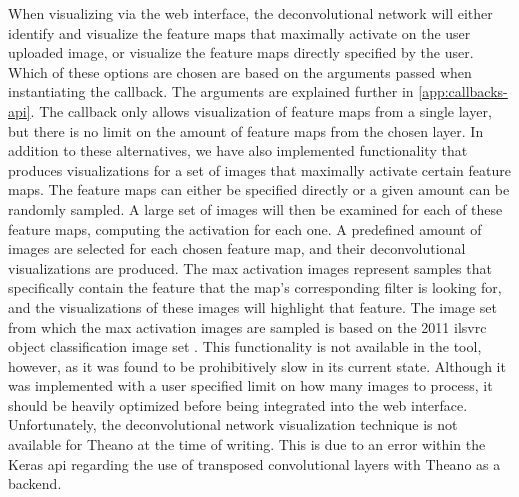\noindent When visualizing via the web interface, the deconvolutional network will either identify and visualize the feature maps that maximally activate on the user uploaded image, or visualize the feature maps directly specified by the user. Which of these options are chosen are based on the arguments passed when instantiating the callback. The arguments are explained further in \autoref{app:callbacks-api}. The callback only allows visualization of feature maps from a single layer, but there is no limit on the amount of feature maps from the chosen layer. In addition to these alternatives, we have also implemented functionality that produces visualizations for a set of images that maximally activate certain feature maps. The feature maps can either be specified directly or a given amount can be randomly sampled. A large set of images will then be examined for each of these feature maps, computing the activation for each one. A predefined amount of images are selected for each chosen feature map, and their deconvolutional visualizations are produced. The max activation images represent samples that specifically contain the feature that the map's corresponding filter is looking for, and the visualizations of these images will highlight that feature. The image set from which the max activation images are sampled is based on the 2011 \acrshort{ilsvrc} object classification image set \cite{imagenet}. This functionality is not available in the tool, however, as it was found to be prohibitively slow in its current state. Although it was implemented with a user specified limit on how many images to process, it should be heavily optimized before being integrated into the web interface. \\

\noindent Unfortunately, the deconvolutional network visualization technique is not available for Theano at the time of writing. This is due to an error within the Keras \acrshort{api} regarding the use of transposed convolutional layers with Theano as a backend.

